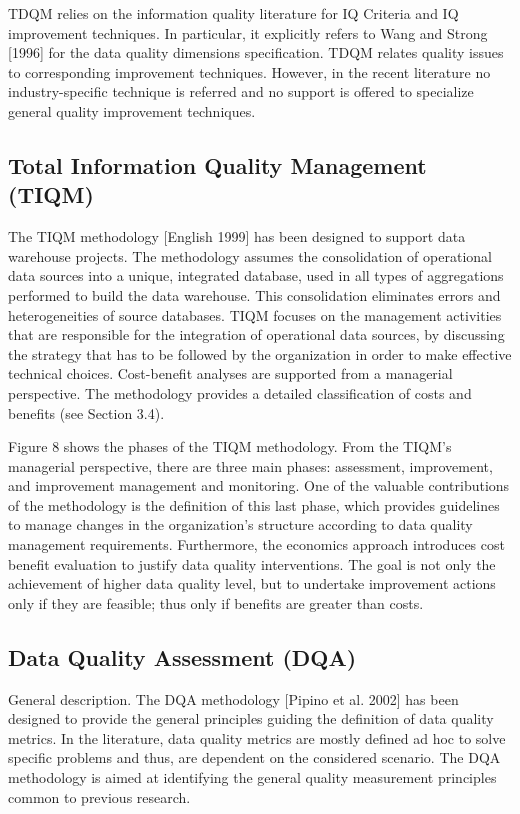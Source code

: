 \documentclass[pdftex,english,oribibl]{llncs}
\begin{document}
    TDQM relies on the information quality literature for IQ Criteria and IQ improvement techniques.
    In particular, it explicitly refers to Wang and Strong [1996] for the data quality dimensions specification.
    TDQM relates quality issues to corresponding improvement techniques.
    However, in the recent literature no industry-specific technique is referred and no support is offered to specialize general quality improvement techniques.


    \subsection{Total Information Quality Management (TIQM)}

    The TIQM methodology [English 1999] has been designed to support data warehouse projects. The methodology assumes the consolidation of operational data sources into a unique, integrated database, used in all types of aggregations performed to build the data warehouse. This consolidation eliminates errors and heterogeneities of source databases. TIQM focuses on the management activities that are responsible for the integration of operational data sources, by discussing the strategy that has to be followed by the organization in order to make effective technical choices. Cost-benefit analyses are supported from a managerial perspective. The methodology provides a detailed classification of costs and benefits (see Section 3.4).

    Figure 8 shows the phases of the TIQM methodology.
    From the TIQM’s managerial perspective, there are three main phases: assessment, improvement, and improvement management and monitoring.
    One of the valuable contributions of the methodology is the definition of this last phase, which provides guidelines to manage changes in the organization’s structure according to data quality management requirements.
    Furthermore, the economics approach introduces cost benefit evaluation to justify data quality interventions.
    The goal is not only the achievement of higher data quality level, but to undertake improvement actions only if they are feasible; thus only if benefits are greater than costs.

    \subsection{Data Quality Assessment (DQA)}
    General description. The DQA methodology [Pipino et al. 2002] has been designed to provide the general principles guiding the definition of data quality metrics. In the literature, data quality metrics are mostly defined ad hoc to solve specific problems and thus, are dependent on the considered scenario. The DQA methodology is aimed at identifying the general quality measurement principles common to previous research.
\end{document}
